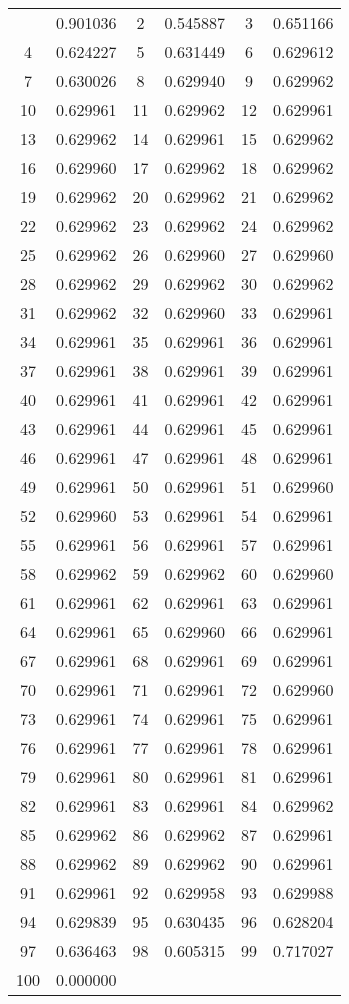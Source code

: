 \documentclass[12pt]{article}
\begin{document}
\begin{longtable}{@{}cc|cc|cc@{}}
\bottomrule
\endlastfoot
1 & 0.901036 & 2 & 0.545887 & 3 & 0.651166 \\
4 & 0.624227 & 5 & 0.631449 & 6 & 0.629612 \\
7 & 0.630026 & 8 & 0.629940 & 9 & 0.629962 \\
10 & 0.629961 & 11 & 0.629962 & 12 & 0.629961 \\
13 & 0.629962 & 14 & 0.629961 & 15 & 0.629962 \\
16 & 0.629960 & 17 & 0.629962 & 18 & 0.629962 \\
19 & 0.629962 & 20 & 0.629962 & 21 & 0.629962 \\
22 & 0.629962 & 23 & 0.629962 & 24 & 0.629962 \\
25 & 0.629962 & 26 & 0.629960 & 27 & 0.629960 \\
28 & 0.629962 & 29 & 0.629962 & 30 & 0.629962 \\
31 & 0.629962 & 32 & 0.629960 & 33 & 0.629961 \\
34 & 0.629961 & 35 & 0.629961 & 36 & 0.629961 \\
37 & 0.629961 & 38 & 0.629961 & 39 & 0.629961 \\
40 & 0.629961 & 41 & 0.629961 & 42 & 0.629961 \\
43 & 0.629961 & 44 & 0.629961 & 45 & 0.629961 \\
46 & 0.629961 & 47 & 0.629961 & 48 & 0.629961 \\
49 & 0.629961 & 50 & 0.629961 & 51 & 0.629960 \\
52 & 0.629960 & 53 & 0.629961 & 54 & 0.629961 \\
55 & 0.629961 & 56 & 0.629961 & 57 & 0.629961 \\
58 & 0.629962 & 59 & 0.629962 & 60 & 0.629960 \\
61 & 0.629961 & 62 & 0.629961 & 63 & 0.629961 \\
64 & 0.629961 & 65 & 0.629960 & 66 & 0.629961 \\
67 & 0.629961 & 68 & 0.629961 & 69 & 0.629961 \\
70 & 0.629961 & 71 & 0.629961 & 72 & 0.629960 \\
73 & 0.629961 & 74 & 0.629961 & 75 & 0.629961 \\
76 & 0.629961 & 77 & 0.629961 & 78 & 0.629961 \\
79 & 0.629961 & 80 & 0.629961 & 81 & 0.629961 \\
82 & 0.629961 & 83 & 0.629961 & 84 & 0.629962 \\
85 & 0.629962 & 86 & 0.629962 & 87 & 0.629961 \\
88 & 0.629962 & 89 & 0.629962 & 90 & 0.629961 \\
91 & 0.629961 & 92 & 0.629958 & 93 & 0.629988 \\
94 & 0.629839 & 95 & 0.630435 & 96 & 0.628204 \\
97 & 0.636463 & 98 & 0.605315 & 99 & 0.717027 \\
100 & 0.000000 &  &  &  &  \\

\end{longtable}
\end{document}

